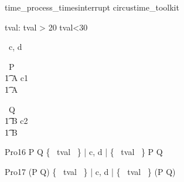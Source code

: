 \begin{zsection}
   \SECTION time\_process\_timesinterrupt \parents circustime\_toolkit
\end{zsection}


\begin{axdef}
   tval: \nat
\where
   tval > 20 \land tval<30
\end{axdef}



\begin{circus}
   \circchannel\ c, d \\
\end{circus}



\begin{circus}
    \circprocess\ P \circdef  \circbegin  \\
    \t1 A \circdef c1 \then \Skip \\
    \t1 \circspot A \\
    \circend
\end{circus}



\begin{circus}
    \circprocess\ Q \circdef  \circbegin  \\
    \t1 B \circdef c2 \then \Skip \\
    \t1 \circspot B \\
    \circend
\end{circus}



\begin{circus}
    \circprocess Pro16 \circdef P \circtimedinterrupt {} \rcirctime Q \lpar \{~ tval ~\} | \lchanset c, d \rchanset | \{~ tval ~\} \rpar P \circtimedinterrupt {} \rcirctime Q \\
\end{circus}

\begin{circus}
    \circprocess Pro17 \circdef (P \circtimedinterrupt {} \rcirctime Q) \lpar \{~ tval ~\} | \lchanset c, d \rchanset | \{~ tval ~\} \rpar (P \circtimedinterrupt {} \rcirctime Q) \\
\end{circus}



